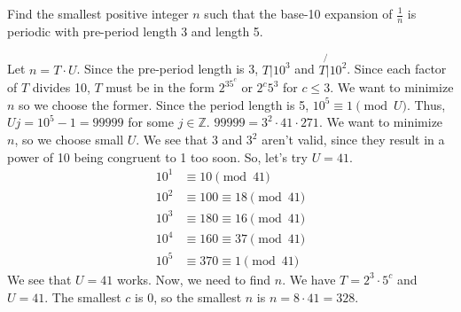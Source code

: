\documentclass{article}
\begin{document}
\begin{problem}{}{}
    Find the smallest positive integer $n$ such that the base-10 expansion of $\frac{1}{n}$ is periodic with pre-period length 3 and length 5.
\end{problem}
\begin{solution}{}{}
    Let $n=T\cdot U$. Since the pre-period length is 3, $T|10^3$ and $T\not{|}10^2$. Since each factor of $T$ divides 10, $T$ must be in the form $2^35^c$ or $2^c5^3$ for $c\leq3$. We want to minimize $n$ so we choose the former. Since the period length is 5, $10^5\equiv1\pmod{U}$. Thus, $Uj=10^5-1=99999$ for some $j\in\mathbb{Z}$. $99999=3^2\cdot41\cdot271$. We want to minimize $n$, so we choose small $U$. We see that $3$ and $3^2$ aren't valid, since they result in a power of 10 being congruent to 1 too soon. So, let's try $U=41$.
    \begin{align*}
        10^1 &\equiv10\pmod{41} \\
        10^2 &\equiv100\equiv18\pmod{41} \\
        10^3 &\equiv180\equiv16\pmod{41} \\
        10^4 &\equiv160\equiv37\pmod{41} \\
        10^5 &\equiv370\equiv1\pmod{41}
    \end{align*}
    We see that $U=41$ works. Now, we need to find $n$. We have $T=2^3\cdot5^c$ and $U=41$. The smallest $c$ is 0, so the smallest $n$ is $n=8\cdot41=328$. \\
\end{solution}
\end{document}
